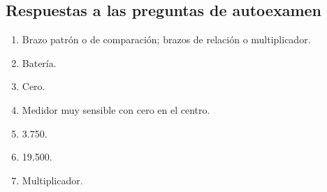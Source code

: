 \documentclass{article}
\numberwithin{equation}{subsection}
\numberwithin{figure}{section}
\numberwithin{table}{section}
\begin{document}
\subsection{Respuestas a las preguntas de autoexamen}
\begin{enumerate}
    \item Brazo patrón o de comparación; brazos de relación o multiplicador.
    \item Batería.
    \item Cero.
    \item Medidor muy sensible con cero en el centro.
    \item 3.750.
    \item 19.500.
    \item Multiplicador.
\end{enumerate}
\end{document}
